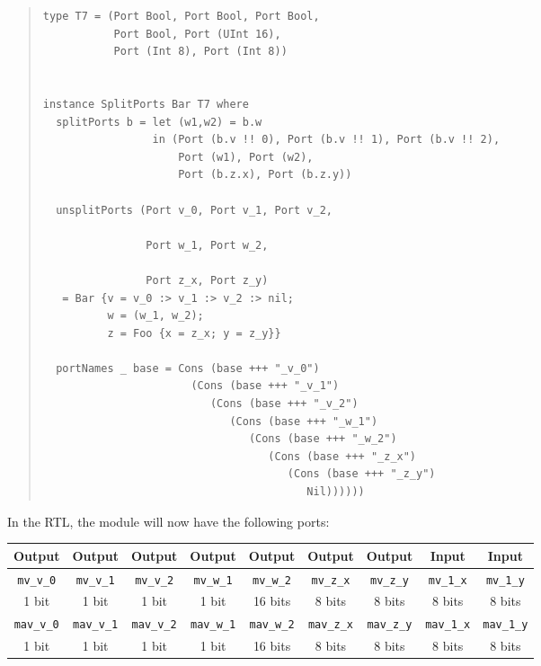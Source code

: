 \begin{quote}
\begin{verbatim}
type T7 = (Port Bool, Port Bool, Port Bool,
           Port Bool, Port (UInt 16),
           Port (Int 8), Port (Int 8))


instance SplitPorts Bar T7 where
  splitPorts b = let (w1,w2) = b.w
                 in (Port (b.v !! 0), Port (b.v !! 1), Port (b.v !! 2),
                     Port (w1), Port (w2),
                     Port (b.z.x), Port (b.z.y))

  unsplitPorts (Port v_0, Port v_1, Port v_2,
                
                Port w_1, Port w_2,
                
                Port z_x, Port z_y)
   = Bar {v = v_0 :> v_1 :> v_2 :> nil;
          w = (w_1, w_2);
          z = Foo {x = z_x; y = z_y}}

  portNames _ base = Cons (base +++ "_v_0")
                       (Cons (base +++ "_v_1")
                          (Cons (base +++ "_v_2")
                             (Cons (base +++ "_w_1")
                                (Cons (base +++ "_w_2")
                                   (Cons (base +++ "_z_x")
                                      (Cons (base +++ "_z_y")
                                         Nil))))))
\end{verbatim}
\end{quote}

In the RTL, the module will now have the following ports:

\begin{tabular}{|c|c|c|c|c|c|c||c|c|}
    \hline
     Output &
     Output &
     Output &
     Output &
     Output &
     Output &
     Output &
     Input  &
     Input  \\
    \hline
     {\tt mv\_v\_0}  &
     {\tt mv\_v\_1}  &
     {\tt mv\_v\_2}  &
     {\tt mv\_w\_1}  &
     {\tt mv\_w\_2}  &
     {\tt mv\_z\_x}  &
     {\tt mv\_z\_y}  &
     {\tt mv\_1\_x}  &
     {\tt mv\_1\_y} \\
      1 bit  &
      1 bit  &
      1 bit  &
      1 bit  &
     16 bits &
      8 bits &
      8 bits &
      8 bits &
      8 bits \\
    \hline
     {\tt mav\_v\_0}  &
     {\tt mav\_v\_1}  &
     {\tt mav\_v\_2}  &
     {\tt mav\_w\_1}  &
     {\tt mav\_w\_2}  &
     {\tt mav\_z\_x}  &
     {\tt mav\_z\_y}  &
     {\tt mav\_1\_x}  &
     {\tt mav\_1\_y} \\
      1 bit  &
      1 bit  &
      1 bit  &
      1 bit  &
     16 bits &
      8 bits &
      8 bits &
      8 bits &
      8 bits \\
    \hline
\end{tabular}

